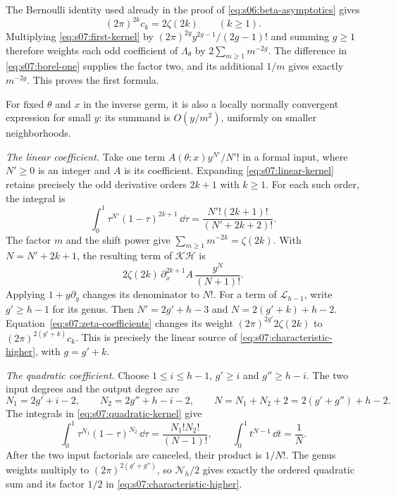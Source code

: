 \begin{prf}
The Bernoulli identity used already in the proof of
\eqref{eq:s06:beta-asymptotics} gives
\begin{equation}\label{eq:s07:zeta-coefficients}
 (2\pi)^{2k}c_k=2\zeta(2k)\qquad(k\geq1).
\end{equation}
Multiplying \eqref{eq:s07:first-kernel} by
$(2\pi)^{2g}y^{2g-1}/(2g-1)!$ and summing $g\geq1$ therefore
weights each odd coefficient of $\Lambda_\theta$ by
$2\sum_{m\geq1}m^{-2g}$. The difference in
\eqref{eq:s07:borel-one} supplies the factor two, and its additional
$1/m$ gives exactly $m^{-2g}$. This proves the first formula.

For fixed $\theta$ and $x$ in the inverse germ, it is also a locally
normally convergent expression for small $y$: its summand is
$O(y/m^2)$, uniformly on smaller neighborhoods.

\smallskip\noindent
\emph{The linear coefficient.}
Take one term $A(\theta;x)y^{N'}/N'!$ in a formal input, where
$N'\geq0$ is an integer and $A$ is its coefficient. Expanding
\eqref{eq:s07:linear-kernel} retains precisely the odd derivative
orders $2k+1$ with $k\geq1$. For each such order, the integral is
\[
 \int_0^1\tau^{N'}(1-\tau)^{2k+1}\,\dd\tau
                   =\frac{N'!(2k+1)!}{(N'+2k+2)!}.
\]
The factor $m$ and the shift power give
$\sum_{m\geq1}m^{-2k}=\zeta(2k)$. With
$N=N'+2k+1$, the resulting term of $\mathcal K\mathcal H$ is
\[
 2\zeta(2k)\,\partial_x^{2k+1}A\,
                              \frac{y^N}{(N+1)!}.
\]
Applying $1+y\partial_y$ changes its denominator to $N!$.
For a term of $\mathcal L_{h-1}$, write
$g'\geq h-1$ for its genus. Then
$N'=2g'+h-3$ and $N=2(g'+k)+h-2$.
Equation~\eqref{eq:s07:zeta-coefficients} changes its weight
$(2\pi)^{2g'}2\zeta(2k)$ to
$(2\pi)^{2(g'+k)}c_k$. This is precisely the linear source of
\eqref{eq:s07:characteristic-higher}, with $g=g'+k$.

\smallskip\noindent
\emph{The quadratic coefficient.}
Choose $1\leq i\leq h-1$, $g'\geq i$ and $g''\geq h-i$.
The two input degrees and the output degree are
\[
 N_1=2g'+i-2,\qquad N_2=2g''+h-i-2,\qquad
 N=N_1+N_2+2=2(g'+g'')+h-2.
\]
The integrals in \eqref{eq:s07:quadratic-kernel} give
\[
 \int_0^1\tau^{N_1}(1-\tau)^{N_2}\,\dd\tau
       =\frac{N_1!N_2!}{(N-1)!},\qquad
 \int_0^1t^{N-1}\,\dd t=\frac1N.
\]
After the two input factorials are canceled, their product is
$1/N!$. The genus weights multiply to
$(2\pi)^{2(g'+g'')}$, so $\mathcal N_h/2$ gives exactly the
ordered quadratic sum and its factor $1/2$ in
\eqref{eq:s07:characteristic-higher}.


\end{prf}
